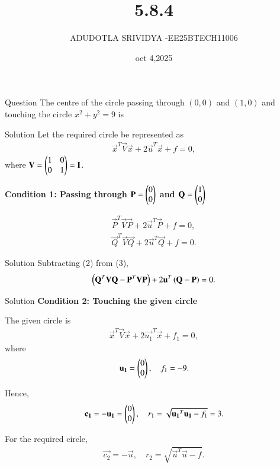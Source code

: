\documentclass{beamer}
\begin{document}
\title 
{5.8.4}
\date{oct 4,2025}


\author 
{ADUDOTLA SRIVIDYA -EE25BTECH11006}






\frame{\titlepage}

\begin{frame}{Question}
The centre of the circle passing through $(0,0)$ and $(1,0)$ and touching the circle $x^2 +y^2 = 9$ is
\end{frame}

\begin{frame}{Solution}
    Let the required circle be represented as
\begin{align}
\vec{x}^{T}\vec{V}\vec{x} + 2\vec{u}^{T}\vec{x} + f = 0,
\label{eq:circle-general}
\end{align}
where $\mathbf{V} = \begin{pmatrix}1 & 0 \\ 0 & 1\end{pmatrix} = \mathbf{I}$.

\textbf{Condition 1: Passing through $\mathbf{P}=\begin{pmatrix}0\\0\end{pmatrix}$ and $\mathbf{Q}=\begin{pmatrix}1\\0\end{pmatrix}$}

\begin{align}
\vec{P}^{T}\vec{V}\vec{P} + 2\vec{u}^{T}\vec{P} + f = 0, \label{eq:circle-P}\\
\vec{Q}^{T}\vec{V}\vec{Q} + 2\vec{u}^{T}\vec{Q} + f = 0. \label{eq:circle-Q}
\end{align}
\end{frame}

\begin{frame}{Solution}
    Subtracting (2) from (3),
\begin{align}
\left(\mathbf{Q}^{T}\mathbf{V}\mathbf{Q} - \mathbf{P}^{T}\mathbf{V}\mathbf{P}\right) + 2\mathbf{u}^{T}\left(\mathbf{Q} - \mathbf{P}\right) = 0. \label{eq:diff}
\end{align}
\end{frame}

\begin{frame}{Solution}
    \textbf{Condition 2: Touching the given circle}

The given circle is
\begin{align}
\vec{x}^{T}\vec{V}\vec{x} + 2\vec{u_1}^{T}\vec{x} + f_1 = 0,
\end{align}
where
\begin{align}
\mathbf{u_1} = \begin{pmatrix}0\\0\end{pmatrix}, \quad f_1 = -9.
\end{align}

Hence,
\begin{align}
\mathbf{c_1} = -\mathbf{u_1} = \begin{pmatrix}0\\0\end{pmatrix}, \quad r_1 = \sqrt{\mathbf{u_1}^{T}\mathbf{u_1} - f_1} = 3.
\end{align}

For the required circle,
\begin{align}
\vec{c_2} = -\vec{u}, \quad r_2 = \sqrt{\vec{u}^{T}\vec{u} - f}. \label{eq:c2r2}
\end{align}
\end{frame}
\end{document}
